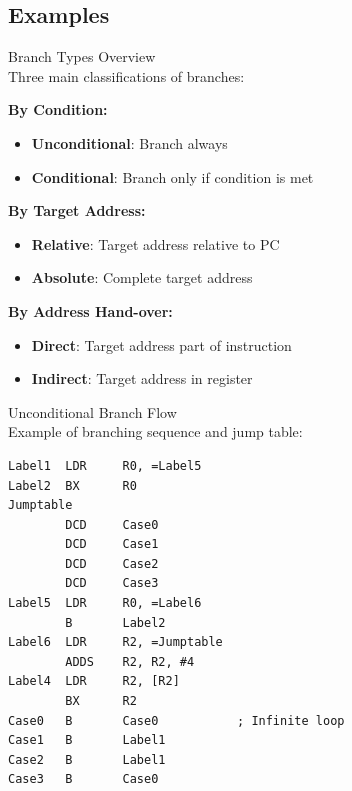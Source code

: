 \subsection{Examples}

\begin{concept}{Branch Types Overview}\\
Three main classifications of branches:

\textbf{By Condition:}
\begin{itemize}
  \item \textbf{Unconditional}: Branch always
  \item \textbf{Conditional}: Branch only if condition is met
\end{itemize}

\textbf{By Target Address:}
\begin{itemize}
  \item \textbf{Relative}: Target address relative to PC
  \item \textbf{Absolute}: Complete target address
\end{itemize}

\textbf{By Address Hand-over:}
\begin{itemize}
  \item \textbf{Direct}: Target address part of instruction
  \item \textbf{Indirect}: Target address in register
\end{itemize}

\end{concept}

\begin{example2}{Unconditional Branch Flow}\\
Example of branching sequence and jump table:
\begin{lstlisting}[language=armasm, style=basesmol]
Label1  LDR     R0, =Label5
Label2  BX      R0
Jumptable
        DCD     Case0
        DCD     Case1
        DCD     Case2
        DCD     Case3
Label5  LDR     R0, =Label6
        B       Label2
Label6  LDR     R2, =Jumptable
        ADDS    R2, R2, #4
Label4  LDR     R2, [R2]
        BX      R2
Case0   B       Case0           ; Infinite loop
Case1   B       Label1
Case2   B       Label1
Case3   B       Case0
\end{lstlisting}
\end{example2}

